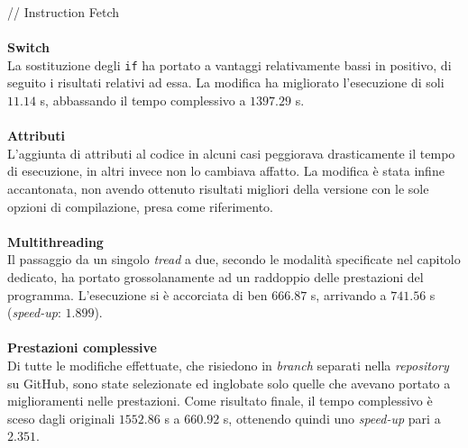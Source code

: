   // Instruction Fetch
\\ \\
\textbf{Switch}\\
  La sostituzione degli \verb|if| ha portato a vantaggi relativamente bassi in 
  positivo, di seguito i risultati relativi ad essa.
  La modifica ha migliorato l'esecuzione di soli $11.14$ s, abbassando il tempo 
  complessivo a $1397.29$ s.
\\ \\
\textbf{Attributi}\\
  L'aggiunta di attributi al codice in alcuni casi peggiorava drasticamente il 
  tempo di esecuzione, in altri invece non lo cambiava affatto. La modifica è 
  stata infine accantonata, non avendo ottenuto risultati migliori della 
  versione con le sole opzioni di compilazione, presa come riferimento.
\\ \\
\textbf{Multithreading}\\
  Il passaggio da un singolo \emph{tread} a due, secondo le modalità 
  specificate nel capitolo dedicato, ha portato grossolanamente ad un raddoppio 
  delle prestazioni del programma. L'esecuzione si è accorciata di ben $666.87$ 
  s, arrivando a $741.56$ s (\textit{speed-up}: $1.899$).
\\ \\
\textbf{Prestazioni complessive}\\
  Di tutte le modifiche effettuate, che risiedono in \textit{branch} separati 
  nella \textit{repository} su GitHub, sono state selezionate ed inglobate solo 
  quelle che avevano portato a miglioramenti nelle prestazioni.
  Come risultato finale, il tempo complessivo è sceso dagli originali $1552.86$ 
  s a $660.92$ s, ottenendo quindi uno \textit{speed-up} pari a $2.351$.
    

